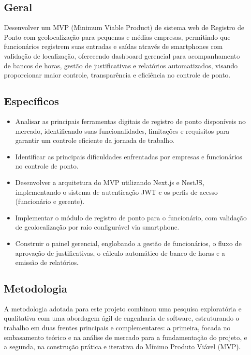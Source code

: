 \subsection{Geral}

Desenvolver um MVP (Minimum Viable Product) de sistema web de Registro de Ponto com geolocalização para pequenas e médias empresas, permitindo que funcionários registrem suas entradas e saídas através de smartphones com validação de localização, oferecendo dashboard gerencial para acompanhamento de bancos de horas, gestão de justificativas e relatórios automatizados, visando proporcionar maior controle, transparência e eficiência no controle de ponto.


\subsection{Específicos}
\begin{itemize}
    \item Analisar as principais ferramentas digitais de registro de ponto disponíveis no mercado, identificando suas funcionalidades, limitações e requisitos para garantir um controle eficiente da jornada de trabalho.
    \item Identificar as principais dificuldades enfrentadas por empresas e funcionários no controle de ponto.
    \item Desenvolver a arquitetura do MVP utilizando Next.js e NestJS, implementando o sistema de autenticação JWT e os perfis de acesso (funcionário e gerente).
    \item Implementar o módulo de registro de ponto para o funcionário, com validação de geolocalização por raio configurável via smartphone.
    \item Construir o painel gerencial, englobando a gestão de funcionários, o fluxo de aprovação de justificativas, o cálculo automático de banco de horas e a emissão de relatórios.
\end{itemize}

\subsection{Metodologia}

A metodologia adotada para este projeto combinou uma pesquisa exploratória e qualitativa com uma abordagem ágil de engenharia de software, estruturando o trabalho em duas frentes principais e complementares: a primeira, focada no embasamento teórico e na análise de mercado para a fundamentação do projeto, e a segunda, na construção prática e iterativa do Mínimo Produto Viável (MVP).

